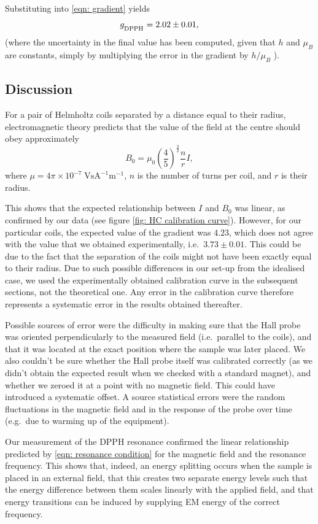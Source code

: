 \documentclass[a4paper]{jpconf}
\numberwithin{equation}{section}
\begin{document}
Substituting into \eqref{eqn: gradient} yields 
\[
	g_{\textsubscript{DPPH}} = 2.02 \pm 0.01,
\] 
(where the uncertainty in the final value has been computed, given that $h$ and $\mu_B$ are constants, simply by multiplying the error in the gradient by $h / \mu_B$ ).

\subsection{Discussion}
For a pair of Helmholtz coils separated by a distance equal to their radius, electromagnetic theory predicts that the value of the field at the centre should obey approximately
\[
	B_0 = \mu_0 \left(\frac45\right)^{\tfrac32} \frac{n}{r} I,
\]
where $\mu = 4\pi\times10^{-7} \; \si{\volt\s\ampere\tothe{-1}\meter\tothe{-1}}$, $n$ is the number of turns per coil, and $r$ is their radius.

This shows that the expected relationship between $I$ and $B_0$ was linear, as confirmed by our data (see figure \ref{fig: HC calibration curve}).
However, for our particular coils, the expected value of the gradient was $4.23$, which does not agree with the value that we obtained experimentally, i.e.\ $3.73 \pm 0.01$. This could be due to the fact that the separation of the coils might not have been exactly equal to their radius. Due to such possible differences in our set-up from the idealised case, we used the experimentally obtained calibration curve in the subsequent sections, not the theoretical one. Any error in the calibration curve therefore represents a systematic error in the results obtained thereafter.

Possible sources of error were the difficulty in making sure that the Hall probe was oriented perpendicularly to the measured field (i.e.\ parallel to the coils), and that it was located at the exact position where the sample was later placed. We also couldn't be sure whether the Hall probe itself was calibrated correctly (as we didn't obtain the expected result when we checked with a standard magnet), and whether we zeroed it at a point with no magnetic field. This could have introduced a systematic offset. A source statistical errors were the random fluctuations in the magnetic field and in the response of the probe over time (e.g.\ due to warming up of the equipment).

Our measurement of the DPPH resonance confirmed the linear relationship predicted by \eqref{eqn: resonance condition} for the magnetic field and the resonance frequency. This shows that, indeed, an energy splitting occurs when the sample is placed in an external field, that this creates two separate energy levels such that the energy difference between them scales linearly with the applied field, and that energy transitions can be induced by supplying EM energy of the correct frequency. 
\end{document}
